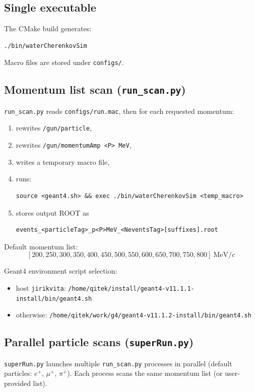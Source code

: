 \documentclass[11pt,a4paper]{article}
\begin{document}
\subsection{Single executable}
The CMake build generates:
\begin{verbatim}
./bin/waterCherenkovSim
\end{verbatim}
Macro files are stored under \texttt{configs/}.

\subsection{Momentum list scan (\texttt{run\_scan.py})}
\texttt{run\_scan.py} reads \texttt{configs/run.mac}, then for each requested momentum:
\begin{enumerate}
  \item rewrites \texttt{/gun/particle},
  \item rewrites \texttt{/gun/momentumAmp <P> MeV},
  \item writes a temporary macro file,
  \item runs:
\begin{verbatim}
source <geant4.sh> && exec ./bin/waterCherenkovSim <temp_macro>
\end{verbatim}
  \item stores output ROOT as
\begin{verbatim}
events_<particleTag>_p<P>MeV_<NeventsTag>[suffixes].root
\end{verbatim}
\end{enumerate}

Default momentum list:
\[
[200,250,300,350,400,450,500,550,600,650,700,750,800]\ \text{MeV}/c
\]

Geant4 environment script selection:
\begin{itemize}
  \item host \texttt{jirikvita}: \texttt{/home/qitek/install/geant4-v11.1.1-install/bin/geant4.sh}
  \item otherwise: \texttt{/home/qitek/work/g4/geant4-v11.1.2-install/bin/geant4.sh}
\end{itemize}

\subsection{Parallel particle scans (\texttt{superRun.py})}
\texttt{superRun.py} launches multiple \texttt{run\_scan.py} processes in parallel (default particles: \(e^+\), \(\mu^+\), \(\pi^+\)). Each process scans the same momentum list (or user-provided list).
\end{document}
